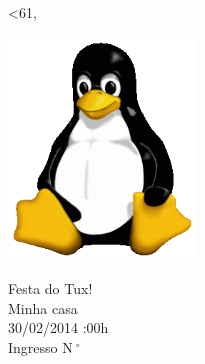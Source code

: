 \documentclass{article}
\newcounter{ingresso}
\begin{document}
\pagestyle{empty}

\loop\ifnum\value{ingresso}<61,
   \vspace{0.7cm}
   \begin{minipage}{10cm}
      \begin{center}
         \includegraphics[width=5cm]{Tux.png}
      \end{center}
   \end{minipage}
   \begin{minipage}{12cm}
      \vspace{.45cm}
      \begin{center}
         \LARGE{Festa do Tux!}\\
         \LARGE{Minha casa}\\
         \LARGE{30/02/2014 :00h}\\
         Ingresso N$\ \mbox{}^{\circ}$ 
      \end{center}
      \vspace{.1cm}
   \end{minipage}
   \addtocounter{ingresso}{1}
\repeat
\end{document}
